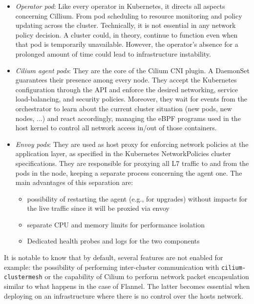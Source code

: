 \begin{itemize}
  \itemsep0em
  \item \textit{Operator pod}: Like every operator in Kubernetes, it directs all
    aspects concerning Cillium. From pod scheduling to resource monitoring and
    policy updating across the cluster. Technically, it is not essential in any
    network policy decision. A cluster could, in theory, continue to function even
    when that pod is temporarily unavailable. However, the operator's absence for a
    prolonged amount of time could lead to infrastructure instability.
  \item \textit{Cilium agent pods}: They are the core of the Cilium CNI plugin.
    A DaemonSet guarantees their presence among every node. They accept the
    Kubernetes configuration through the API and enforce the desired networking,
    service load-balancing, and security policies.
    Moreover, they wait for events from the orchestrator to learn about the
    current cluster situation (new pods, new nodes, ...) and react accordingly,
    managing the eBPF programs used in the host kernel to control all network
    access in/out of those containers.
  \item \textit{Envoy pods}: They are used as host proxy for enforcing network
    policies at the application layer, as specified in the Kubernetes
    NetworkPolicies cluster specifications. They are responsible for proxying all L7
    traffic to and from the pods in the node, keeping a separate process concerning
    the agent one.  The main advantages of this separation are:
    \begin{itemize}
      \itemsep0em
      \item possibility of restarting the agent (e.g., for upgrades) without
        impacts for the live traffic since it will be proxied via envoy
      \item separate CPU and memory limits for performance isolation
      \item Dedicated health probes and logs for the two components
    \end{itemize}
\end{itemize}

It is notable to know that by default, several features are not enabled for
example: the possibility of performing inter-cluster communication with
\texttt{cilium-clustermesh} or the capability of Cilium to perform network
packet encapsulation similar to what happens in the case of Flannel.
The latter becomes essential when deploying on an infrastructure where there is
no control over the hosts network.

